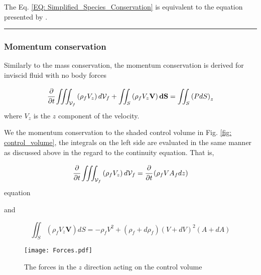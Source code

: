 \documentclass[../Article_Model_Parameters.tex]{subfiles}
\begin{document}
	The Eq. \ref{EQ: Simplified_Species_Conservation} is equivalent to the equation presented by \citet{Reverchon1996}.
	
	\hrule
	
	\subsubsection{Momentum conservation}
	
	Similarly to the mass conservation, the momentum conservation is derived for inviscid fluid with no body forces
	
	{\footnotesize
		\begin{equation}
			\cfrac{\partial}{\partial t} \iiint_{\mathcal{V}_f} \left( \rho_f V_z \right) d\mathcal{V}_f + \iint_S \left( \rho_f V_z \textbf{V} \right) \textbf{dS} = \iint_S \left( P dS \right)_z
			\label{EQ: Momentum_Integral_Form}
		\end{equation}
	}
	where $V_z$ is the $z$ component of the velocity.

	We the momentum conservation to the shaded control volume in Fig. \ref{fig: control_volume}, the integrals on the left side are evaluated in the same manner as discussed above in the regard to the continuity equation. That is,
	
	{\footnotesize
		\begin{equation}
			\cfrac{\partial}{\partial t} \iiint_{\mathcal{V}_f} \left( \rho_f V_z \right) d \mathcal{V}_f = \cfrac{\partial}{\partial t} \left( \rho_f V A_f dz \right)
			\label{EQ: Force_Continuity_Monenmtum}
		\end{equation}equation
	}
	
	and 
	
	{\footnotesize
		\begin{equation}
			\iint_S \left( \rho_f V_z \textbf{V} \right) dS = -\rho_f V^2 + \left( \rho_f + d \rho_f \right) \left( V+dV \right)^2 \left( A+dA \right)
		\end{equation}
	}
	
	\begin{figure}[h]
		\centering
		\texttt{[image: Forces.pdf]}
		\caption{The forces in the $z$ direction acting on the control volume}
		\label{fig: Forces_Momentum_Control_Volume}
	\end{figure}
	
\end{document}
